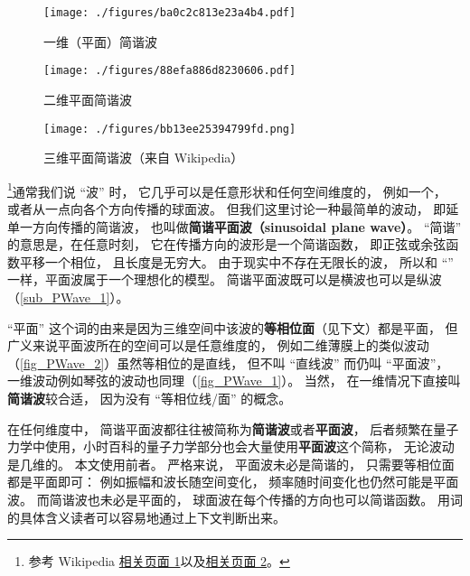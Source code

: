 
\begin{figure}[ht]
\centering
\texttt{[image: ./figures/ba0c2c813e23a4b4.pdf]}
\caption{一维（平面）简谐波} \label{fig_PWave_1}
\end{figure}

\begin{figure}[ht]
\centering
\texttt{[image: ./figures/88efa886d8230606.pdf]}
\caption{二维平面简谐波} \label{fig_PWave_2}
\end{figure}

\begin{figure}[ht]
\centering
\texttt{[image: ./figures/bb13ee25394799fd.png]}
\caption{三维平面简谐波（来自 Wikipedia）} \label{fig_PWave_3}
\end{figure}


\footnote{参考 Wikipedia \href{https://en.wikipedia.org/wiki/Plane_wave}{相关页面 1}以及\href{https://en.wikipedia.org/wiki/Sinusoidal_plane_wave}{相关页面 2}。}通常我们说 “波” 时， 它几乎可以是任意形状和任何空间维度的， 例如一个， 或者从一点向各个方向传播的球面波。 但我们这里讨论一种最简单的波动， 即延单一方向传播的简谐波， 也叫做\textbf{简谐平面波（sinusoidal plane wave）}。 “简谐” 的意思是，在任意时刻， 它在传播方向的波形是一个简谐函数， 即正弦或余弦函数平移一个相位， 且长度是无穷大。 由于现实中不存在无限长的波， 所以和 “” 一样，平面波属于一个理想化的模型。 简谐平面波既可以是横波也可以是纵波（\autoref{sub_PWave_1}）。

“平面” 这个词的由来是因为三维空间中该波的\textbf{等相位面}（见下文）都是平面， 但广义来说平面波所在的空间可以是任意维度的， 例如二维薄膜上的类似波动（\autoref{fig_PWave_2}）虽然等相位的是直线， 但不叫 “直线波” 而仍叫 “平面波”， 一维波动例如琴弦的波动也同理（\autoref{fig_PWave_1}）。 当然， 在一维情况下直接叫\textbf{简谐波}较合适， 因为没有 “等相位线/面” 的概念。

在任何维度中， 简谐平面波都往往被简称为\textbf{简谐波}或者\textbf{平面波}， 后者频繁在量子力学中使用，小时百科的量子力学部分也会大量使用\textbf{平面波}这个简称， 无论波动是几维的。 本文使用前者。 严格来说， 平面波未必是简谐的， 只需要等相位面都是平面即可： 例如振幅和波长随空间变化， 频率随时间变化也仍然可能是平面波。 而简谐波也未必是平面的， 球面波在每个传播的方向也可以简谐函数。 用词的具体含义读者可以容易地通过上下文判断出来。

